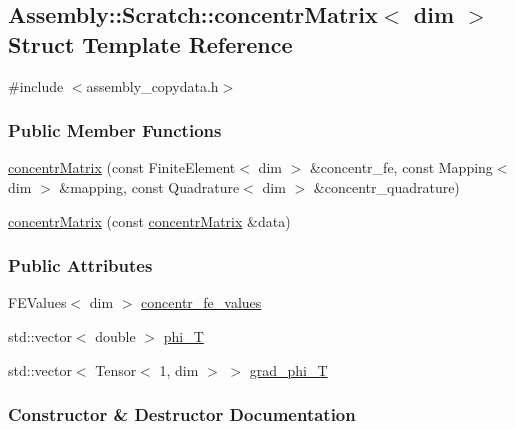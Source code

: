 \hypertarget{struct_assembly_1_1_scratch_1_1concentr_matrix}{}\subsection{Assembly\+:\+:Scratch\+:\+:concentr\+Matrix$<$ dim $>$ Struct Template Reference}
\label{struct_assembly_1_1_scratch_1_1concentr_matrix}


{\ttfamily \#include $<$assembly\+\_\+copydata.\+h$>$}

\subsubsection*{Public Member Functions}
\begin{DoxyCompactItemize}
\item 
\hyperlink{struct_assembly_1_1_scratch_1_1concentr_matrix_a09f4fe4a7e3f71ef4817e9a07b618473}{concentr\+Matrix} (const Finite\+Element$<$ dim $>$ \&concentr\+\_\+fe, const Mapping$<$ dim $>$ \&mapping, const Quadrature$<$ dim $>$ \&concentr\+\_\+quadrature)
\item 
\hyperlink{struct_assembly_1_1_scratch_1_1concentr_matrix_ae04f5cdc68467da262a5c29712790d24}{concentr\+Matrix} (const \hyperlink{struct_assembly_1_1_scratch_1_1concentr_matrix}{concentr\+Matrix} \&data)
\end{DoxyCompactItemize}
\subsubsection*{Public Attributes}
\begin{DoxyCompactItemize}
\item 
F\+E\+Values$<$ dim $>$ \hyperlink{struct_assembly_1_1_scratch_1_1concentr_matrix_ab33eea0fdd2716aa1aab80e22a3c3d1b}{concentr\+\_\+fe\+\_\+values}
\item 
std\+::vector$<$ double $>$ \hyperlink{struct_assembly_1_1_scratch_1_1concentr_matrix_a66a048dcc5601ac8bf72829c8a2eb567}{phi\+\_\+\+T}
\item 
std\+::vector$<$ Tensor$<$ 1, dim $>$ $>$ \hyperlink{struct_assembly_1_1_scratch_1_1concentr_matrix_a8a597e54b433d76d7e1f71b65b7155e5}{grad\+\_\+phi\+\_\+\+T}
\end{DoxyCompactItemize}


\subsubsection{Constructor \& Destructor Documentation}
\hypertarget{struct_assembly_1_1_scratch_1_1concentr_matrix_a09f4fe4a7e3f71ef4817e9a07b618473}{}
